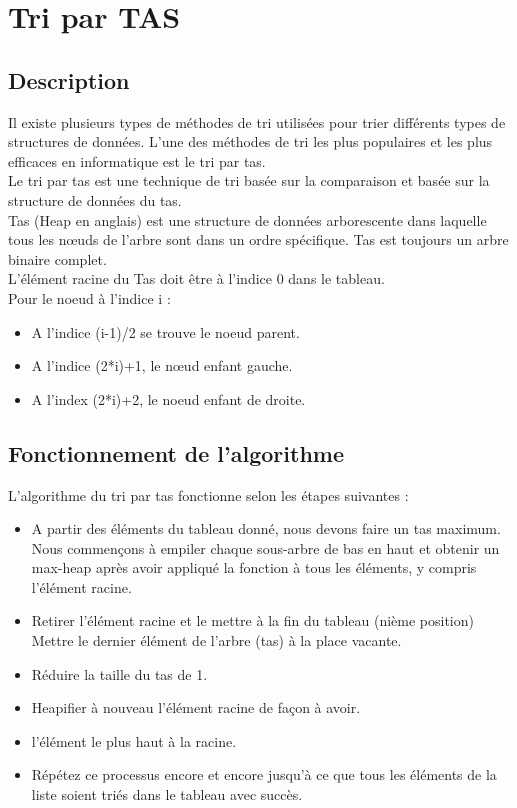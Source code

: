 \chapter{Tri par TAS}
\section {Description}
Il existe plusieurs types de méthodes de tri utilisées pour trier différents types de structures de données. L'une des méthodes de tri les plus populaires et les plus efficaces en informatique est le tri par tas.
\\
Le tri par tas  est une technique de tri basée sur la comparaison et basée sur la structure de données du tas.
\\
Tas (Heap en anglais) est une structure de données arborescente dans laquelle tous les nœuds de l'arbre sont dans un ordre spécifique. Tas est toujours un arbre binaire complet. 
\\
L'élément racine du Tas doit être à l'indice 0 dans le tableau.
\\
Pour le noeud à l'indice i :
\begin{itemize}
    \item  A l'indice (i-1)/2 se trouve le noeud parent.
    \item  A l'indice (2*i)+1, le nœud enfant gauche.
    \item  A l'index (2*i)+2, le noeud enfant de droite.
\end{itemize}


\section{Fonctionnement de l'algorithme}
L'algorithme du tri par tas fonctionne selon les étapes suivantes :
\begin{itemize}
 
     \item A partir des éléments du tableau donné, nous devons faire un tas maximum. Nous  commençons à empiler chaque sous-arbre de bas en haut et obtenir un max-heap après avoir appliqué la fonction à tous les éléments, y compris l'élément racine.
    \item  Retirer l'élément racine et le mettre à la fin du tableau (nième position) Mettre le dernier élément de l'arbre (tas) à la place vacante.
    \item  Réduire la taille du tas de 1.
    \item  Heapifier à nouveau l'élément racine de façon à avoir.
    \item l'élément le plus haut à la racine.
    \item Répétez ce processus encore et encore jusqu'à ce que tous les éléments de la liste soient triés dans le tableau avec succès.
\end{itemize}

